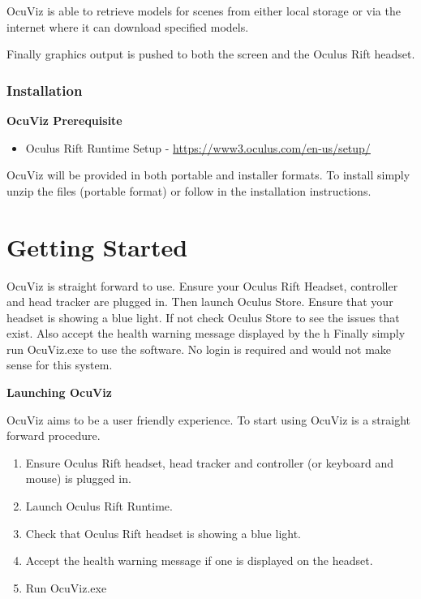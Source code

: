 \documentclass[a4paper,12pt]{article}
\begin{document}
OcuViz is able to retrieve models for scenes from either local storage or via the internet where it can download specified models.

Finally graphics output is pushed to both the screen and the Oculus Rift headset.

\subsubsection{Installation}
\textbf{OcuViz Prerequisite}
\begin{itemize}
\item Oculus Rift Runtime Setup - \url{https://www3.oculus.com/en-us/setup/}
\end{itemize}

OcuViz will be provided in both portable and installer formats. To install simply unzip the files (portable format) or follow in the installation instructions.

\section{Getting Started}
OcuViz is straight forward to use. Ensure your Oculus Rift Headset, controller and head tracker are plugged in. Then launch Oculus Store. Ensure that your headset is showing a blue light. If not check Oculus Store to see the issues that exist. Also accept the health warning message displayed by the h Finally simply run OcuViz.exe to use the software. No login is required and would not make sense for this system.
\\

\newpage

\textbf{Launching OcuViz}

OcuViz aims to be a user friendly experience. To start using OcuViz is a straight forward procedure.

\begin{enumerate}
\item Ensure Oculus Rift headset, head tracker and controller (or keyboard and mouse) is plugged in.
\item Launch Oculus Rift Runtime.
\item Check that Oculus Rift headset is showing a blue light. 
\item Accept the health warning message if one is displayed on the headset.
\item Run OcuViz.exe

\end{enumerate}
\end{document}
